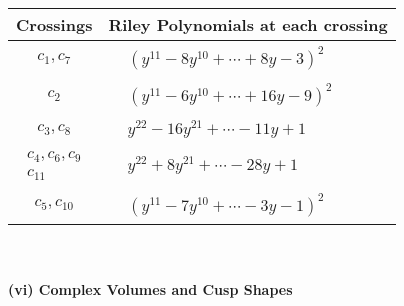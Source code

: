 \documentclass[1p]{elsarticle_modified}
\theoremstyle{definition}
\begin{document}
\begin{tabular}{m{50pt}|m{274pt}}
Crossings & \hspace{64pt}Riley Polynomials at each crossing \\
\hline $$\begin{aligned}c_{1},c_{7}\end{aligned}$$&$\begin{aligned}
&(y^{11}-8 y^{10}+\cdots+8 y-3)^{2}
\end{aligned}$\\
\hline $$\begin{aligned}c_{2}\end{aligned}$$&$\begin{aligned}
&(y^{11}-6 y^{10}+\cdots+16 y-9)^{2}
\end{aligned}$\\
\hline $$\begin{aligned}c_{3},c_{8}\end{aligned}$$&$\begin{aligned}
&y^{22}-16 y^{21}+\cdots-11 y+1
\end{aligned}$\\
\hline $$\begin{aligned}c_{4},c_{6},c_{9}\\c_{11}\end{aligned}$$&$\begin{aligned}
&y^{22}+8 y^{21}+\cdots-28 y+1
\end{aligned}$\\
\hline $$\begin{aligned}c_{5},c_{10}\end{aligned}$$&$\begin{aligned}
&(y^{11}-7 y^{10}+\cdots-3 y-1)^{2}
\end{aligned}$\\
\hline
\end{tabular}\\~\\
\newpage\flushleft \textbf{(vi) Complex Volumes and Cusp Shapes}
\end{document}
